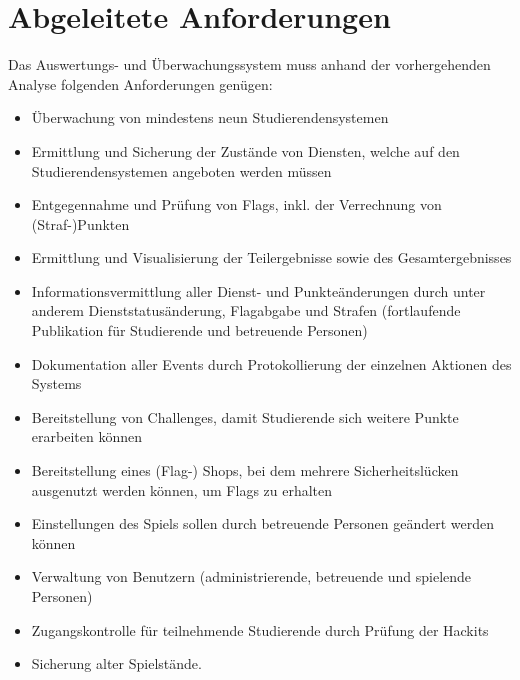 \section{Abgeleitete Anforderungen}
\label{sec:Abgeleitete_Anforderungen}

Das Auswertungs- und Überwachungssystem muss anhand der vorhergehenden Analyse folgenden Anforderungen genügen:
\begin{itemize}
	\item Überwachung von mindestens neun Studierendensystemen
	\item Ermittlung und Sicherung der Zustände von Diensten, welche auf den Studierendensystemen angeboten werden müssen
	\item Entgegennahme und Prüfung von Flags, inkl. der Verrechnung von (Straf-)Punkten
	\item Ermittlung und Visualisierung der Teilergebnisse sowie des Gesamtergebnisses
	\item Informationsvermittlung aller Dienst- und Punkteänderungen durch unter anderem Dienststatusänderung, Flagabgabe und Strafen (fortlaufende Publikation für Studierende und betreuende Personen)
	\item Dokumentation aller Events durch Protokollierung der einzelnen Aktionen des Systems
	\item Bereitstellung von Challenges, damit Studierende sich weitere Punkte erarbeiten können
	\item Bereitstellung eines (Flag-) Shops, bei dem mehrere Sicherheitslücken ausgenutzt werden können, um Flags zu erhalten
	\item Einstellungen des Spiels sollen durch betreuende Personen geändert werden können
	\item Verwaltung von Benutzern (administrierende, betreuende und spielende Personen)
	\item Zugangskontrolle für teilnehmende Studierende durch Prüfung der Hackits
	\item Sicherung alter Spielstände.
\end{itemize}